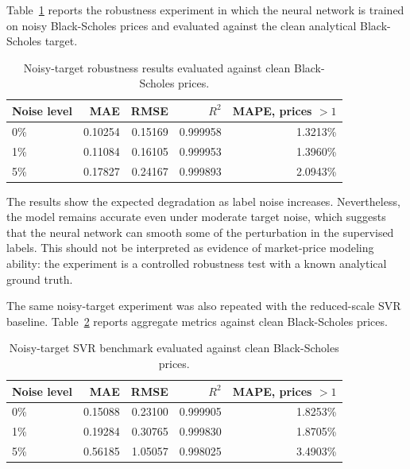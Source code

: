 Table~\ref{tab:noisy-targets} reports the robustness experiment in which the
neural network is trained on noisy Black-Scholes prices and evaluated against
the clean analytical Black-Scholes target.

\begin{table}[H]
    \centering
    \begin{tabular}{lrrrr}
        \toprule
        Noise level & MAE & RMSE & $R^2$ & MAPE, prices $> 1$ \\
        \midrule
        0\% & 0.10254 & 0.15169 & 0.999958 & 1.3213\% \\
        1\% & 0.11084 & 0.16105 & 0.999953 & 1.3960\% \\
        5\% & 0.17827 & 0.24167 & 0.999893 & 2.0943\% \\
        \bottomrule
    \end{tabular}
    \caption{Noisy-target robustness results evaluated against clean Black-Scholes prices.}
    \label{tab:noisy-targets}
\end{table}

The results show the expected degradation as label noise increases.
Nevertheless, the model remains accurate even under moderate target noise,
which suggests that the neural network can smooth some of the perturbation in
the supervised labels.
This should not be interpreted as evidence of market-price modeling ability:
the experiment is a controlled robustness test with a known analytical ground
truth.

The same noisy-target experiment was also repeated with the reduced-scale SVR
baseline. Table~\ref{tab:noisy-svr-targets} reports aggregate metrics against
clean Black-Scholes prices.

\begin{table}[H]
    \centering
    \begin{tabular}{lrrrr}
        \toprule
        Noise level & MAE & RMSE & $R^2$ & MAPE, prices $> 1$ \\
        \midrule
        0\% & 0.15088 & 0.23100 & 0.999905 & 1.8253\% \\
        1\% & 0.19284 & 0.30765 & 0.999830 & 1.8705\% \\
        5\% & 0.56185 & 1.05057 & 0.998025 & 3.4903\% \\
        \bottomrule
    \end{tabular}
    \caption{Noisy-target SVR benchmark evaluated against clean Black-Scholes prices.}
    \label{tab:noisy-svr-targets}
\end{table}

